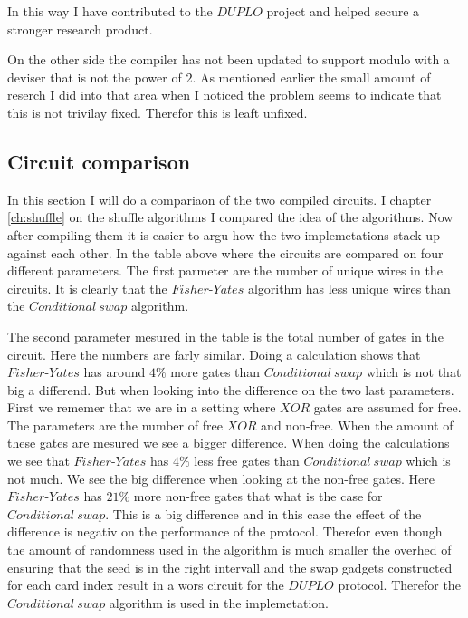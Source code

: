In this way I have contributed to the $DUPLO$ project and helped secure a stronger research product.

On the other side the compiler has not been updated to support modulo with a deviser that is not the power of $2$. As mentioned earlier the small amount of reserch I did into that area when I noticed the problem seems to indicate that this is not trivilay fixed. Therefor this is leaft unfixed.

\subsection{Circuit comparison}


In this section I will do a compariaon of the two compiled circuits. I chapter \ref{ch:shuffle} on the shuffle algorithms I compared the idea of the algorithms. Now after compiling them it is easier to argu how the two implemetations stack up against each other. In the table above where the circuits are compared on four different parameters. The first parmeter are the number of unique wires in the circuits. It is clearly that the $Fisher\text{-}Yates$ algorithm has less unique wires than the $Conditional~swap$ algorithm.


The second parameter mesured in the table is the total number of gates in the circuit. Here the numbers are farly similar. Doing a calculation shows that $Fisher\text{-}Yates$ has around $4\%$ more gates than $Conditional~swap$ which is not that big a differend. But when looking into the difference on the two last parameters. First we rememer that we are in a setting where $XOR$ gates are assumed for free. The parameters are the number of free $XOR$ and non-free. When the amount of these gates are mesured we see a bigger difference. When doing the calculations we see that $Fisher\text{-}Yates$ has $4\%$ less free gates than $Conditional~swap$ which is not much. We see the big difference when looking at the non-free gates. Here $Fisher\text{-}Yates$ has $21\%$ more non-free gates that what is the case for $Conditional~swap$. This is a big difference and in this case the effect of the difference is negativ on the performance of the protocol. Therefor even though the amount of randomness used in the algorithm is much smaller the overhed of ensuring that the seed is in the right intervall and the swap gadgets constructed for each card index result in a wors circuit for the $DUPLO$ protocol. Therefor the $Conditional~swap$ algorithm is used in the implemetation.


